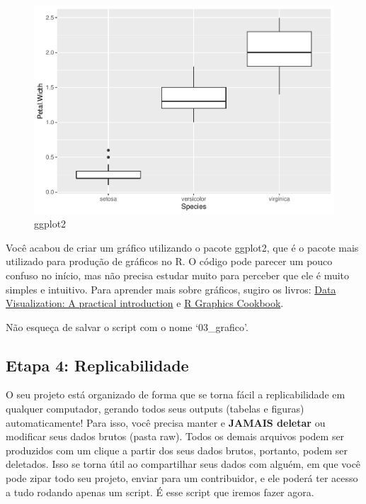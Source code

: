\documentclass[
]{book}
\begin{document}
\begin{figure}
\centering
\includegraphics{_main_files/figure-latex/graph-1.pdf}
\caption{\label{fig:graph}ggplot2}
\end{figure}

Você acabou de criar um gráfico utilizando o pacote ggplot2, que é o pacote mais utilizado para produção de gráficos no R. O código pode parecer um pouco confuso no início, mas não precisa estudar muito para perceber que ele é muito simples e intuitivo. Para aprender mais sobre gráficos, sugiro os livros: \href{https://rkabacoff.github.io/datavis/}{Data Visualization: A practical introduction} e \href{https://r-graphics.org/}{R Graphics Cookbook}.

Não esqueça de salvar o script com o nome `03\_grafico'.

\hypertarget{etapa-4-replicabilidade}{%
\subsection{Etapa 4: Replicabilidade}\label{etapa-4-replicabilidade}}

O seu projeto está organizado de forma que se torna fácil a replicabilidade em qualquer computador, gerando todos seus outputs (tabelas e figuras) automaticamente! Para isso, você precisa manter e \textbf{JAMAIS deletar} ou modificar seus dados brutos (pasta raw). Todos os demais arquivos podem ser produzidos com um clique a partir dos seus dados brutos, portanto, podem ser deletados. Isso se torna útil ao compartilhar seus dados com alguém, em que você pode zipar todo seu projeto, enviar para um contribuidor, e ele poderá ter acesso a tudo rodando apenas um script. É esse script que iremos fazer agora.
\end{document}
